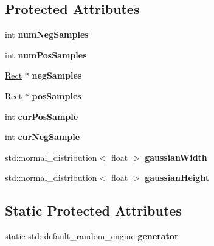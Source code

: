 \subsection*{Protected Attributes}
\begin{DoxyCompactItemize}
\item 
\hypertarget{classSingleSampler_aae910dbaf3271e79601e9e4c786eaad1}{}int {\bfseries num\+Neg\+Samples}\label{classSingleSampler_aae910dbaf3271e79601e9e4c786eaad1}

\item 
\hypertarget{classSingleSampler_a9a624f9a0519802d38fa760578e43ce2}{}int {\bfseries num\+Pos\+Samples}\label{classSingleSampler_a9a624f9a0519802d38fa760578e43ce2}

\item 
\hypertarget{classSingleSampler_add879b72a8fb9bc537b2c73def6b4ab4}{}\hyperlink{classRect}{Rect} $\ast$ {\bfseries neg\+Samples}\label{classSingleSampler_add879b72a8fb9bc537b2c73def6b4ab4}

\item 
\hypertarget{classSingleSampler_a66244f71e586f614b1f505cfa74034bf}{}\hyperlink{classRect}{Rect} $\ast$ {\bfseries pos\+Samples}\label{classSingleSampler_a66244f71e586f614b1f505cfa74034bf}

\item 
\hypertarget{classSingleSampler_a584faf8d63d5985a64f7eb1f560b501c}{}int {\bfseries cur\+Pos\+Sample}\label{classSingleSampler_a584faf8d63d5985a64f7eb1f560b501c}

\item 
\hypertarget{classSingleSampler_a9ed280c3389a16c34a7e7ba97150d2c1}{}int {\bfseries cur\+Neg\+Sample}\label{classSingleSampler_a9ed280c3389a16c34a7e7ba97150d2c1}

\item 
\hypertarget{classSingleSampler_af5aa1a24a704f7b553b40c846d7425fd}{}std\+::normal\+\_\+distribution$<$ float $>$ {\bfseries gaussian\+Width}\label{classSingleSampler_af5aa1a24a704f7b553b40c846d7425fd}

\item 
\hypertarget{classSingleSampler_ae8dc991f539b05c59884da2107b2cedb}{}std\+::normal\+\_\+distribution$<$ float $>$ {\bfseries gaussian\+Height}\label{classSingleSampler_ae8dc991f539b05c59884da2107b2cedb}

\end{DoxyCompactItemize}
\subsection*{Static Protected Attributes}
\begin{DoxyCompactItemize}
\item 
\hypertarget{classSingleSampler_a54b9846441e263f759935b621a89cadc}{}static std\+::default\+\_\+random\+\_\+engine {\bfseries generator}\label{classSingleSampler_a54b9846441e263f759935b621a89cadc}

\end{DoxyCompactItemize}


